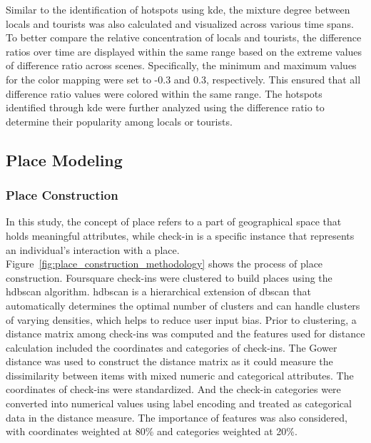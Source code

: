 \documentclass{article}
\theoremstyle{remark}
\begin{document}
Similar to the identification of hotspots using \acrshort{kde}, the mixture degree between locals and tourists was also calculated and visualized across various time spans. To better compare the relative concentration of locals and tourists, the difference ratios over time are displayed within the same range based on the extreme values of difference ratio across scenes. Specifically, the minimum and maximum values for the color mapping were set to -0.3 and 0.3, respectively. This ensured that all difference ratio values were colored within the same range. The hotspots identified through \acrshort{kde} were further analyzed using the difference ratio to determine their popularity among locals or tourists.

\subsection{Place Modeling} \label{place_modeling}

\subsubsection{Place Construction} \label{place_construction}

In this study, the concept of place refers to a part of geographical space that holds meaningful attributes, while check-in is a specific instance that represents an individual's interaction with a place. Figure~\ref{fig:place_construction_methodology} shows the process of place construction. Foursquare check-ins were clustered to build places using the \acrfull{hdbscan} \citep{campello_density-based_2013} algorithm. \acrshort{hdbscan} is a hierarchical extension of \acrshort{dbscan} that automatically determines the optimal number of clusters and can handle clusters of varying densities, which helps to reduce user input bias. Prior to clustering, a distance matrix among check-ins was computed and the features used for distance calculation included the coordinates and categories of check-ins. The Gower distance \citep{gower_general_1971} was used to construct the distance matrix as it could measure the dissimilarity between items with mixed numeric and categorical attributes. The coordinates of check-ins were standardized. And the check-in categories were converted into numerical values using label encoding and treated as categorical data in the distance measure. The importance of features was also considered, with coordinates weighted at 80\% and categories weighted at 20\%.
\end{document}
